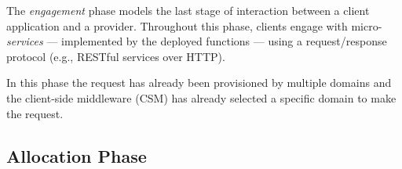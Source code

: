 The \textit{engagement} phase models the last stage of interaction between a client application and a provider. Throughout this phase, clients engage with micro-\textit{services} --- implemented by the deployed functions --- using a request/response protocol (e.g., RESTful services over HTTP). 


In this phase the request has already been provisioned by multiple domains and the client-side middleware (CSM) has already selected a specific domain to make the request. 







\subsection*{Allocation Phase}\label{sec:A3-E-allocation}

